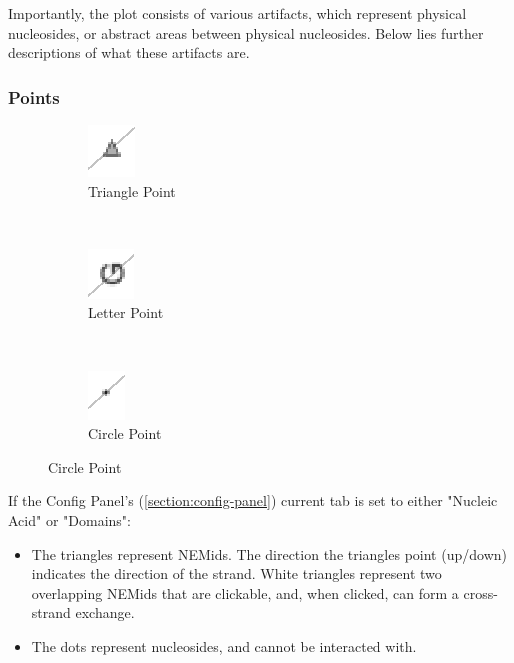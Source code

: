 \documentclass[titlepage]{article}
\begin{document}
	Importantly, the plot consists of various artifacts, which represent physical nucleosides, or abstract areas between physical nucleosides. Below lies further descriptions of what these artifacts are.
	
	\subsubsection{Points}
	
	\begin{figure}[h]
		\centering
		\caption{Side View Plot Point Graphics}
		\label{fig:side-view-plot-point-graphics}
		
		\begin{subfigure}{.3\linewidth}
			\centering
			\includegraphics[width=.3in]{up-triangle.png}
			\caption{Triangle Point}
			\label{fig:up-triangle}
		\end{subfigure}%
 		~
		\begin{subfigure}{.3\linewidth}
			\centering
			\includegraphics[width=.3in]{base-symbol.png}
			\caption{Letter Point}
			\label{fig:base-symbol}
		\end{subfigure}%
		~
		\begin{subfigure}{.3\linewidth}
			\centering
			\includegraphics[width=.3in]{nondominant-point.png}
			\caption{Circle Point}
			\label{fig:nondominant-point}
		\end{subfigure}
	\end{figure}

	If the Config Panel's (\ref{section:config-panel}) current tab is set to either "Nucleic Acid" or "Domains":
	\begin{itemize}
		\item The triangles represent NEMids. The direction the triangles point (up/down) indicates the direction of the strand. White triangles represent two overlapping NEMids that are clickable, and, when clicked, can form a cross-strand exchange.
		\item The dots represent nucleosides, and cannot be interacted with.
	\end{itemize}
\end{document}
